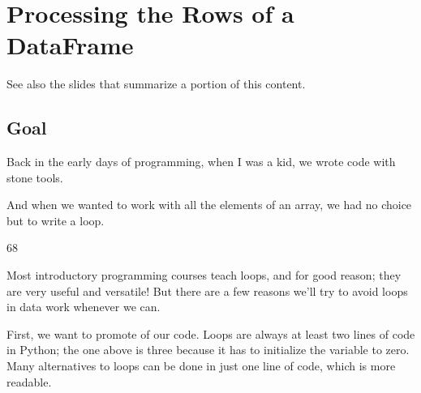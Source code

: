 \documentclass[letterpaper,10pt,english]{jupyterBook}
\begin{document}
\chapter{Processing the Rows of a DataFrame}
\label{\detokenize{chapter-11-processing-rows:processing-the-rows-of-a-dataframe}}\label{\detokenize{chapter-11-processing-rows::doc}}
\sphinxAtStartPar
See also the slides that summarize a portion of this content.


\section{Goal}
\label{\detokenize{chapter-11-processing-rows:goal}}
\sphinxAtStartPar
Back in the early days of programming, when I was a kid, we wrote code with stone tools.

\sphinxAtStartPar
{}

\sphinxAtStartPar
And when we wanted to work with all the elements of an array, we had no choice but to write a loop.

\begin{sphinxVerbatim}[commandchars=\\\{\}]
  \PYG{p}{[}               \PYG{p}{]}

  
   
      

\end{sphinxVerbatim}

\begin{sphinxVerbatim}[commandchars=\\\{\}]
68
\end{sphinxVerbatim}

\sphinxAtStartPar
Most introductory programming courses teach loops, and for good reason; they are very useful and versatile!  But there are a few reasons we’ll try to avoid loops in data work whenever we can.

\sphinxAtStartPar
First, we want to promote  of our code.  Loops are always at least two lines of code in Python; the one above is three because it has to initialize the  variable to zero.  Many alternatives to loops can be done in just one line of code, which is more readable.
\end{document}
